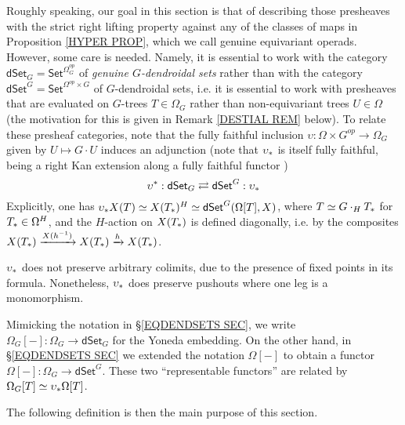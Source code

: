 \documentclass[a4paper,10pt
 ,draft
]{article}%
\begin{document}
Roughly speaking, our goal in this section is that of describing those presheaves with the 
strict right lifting property against any of the classes of maps in Proposition \ref{HYPER PROP},
which we call genuine equivariant operads.
However, some care is needed.
Namely, it is essential to work with the category
$\mathsf{dSet}_G = \mathsf{Set}^{\Omega_G^{op}}$
of \textit{genuine $G$-dendroidal sets}
rather than with the category
$\mathsf{dSet}^G = \mathsf{Set}^{\Omega^{op} \times G}$
of $G$-dendroidal sets, i.e. it is essential to work with presheaves that are evaluated on 
$G$-trees $T \in \Omega_G$
rather than non-equivariant trees $U \in \Omega$
(the motivation for this is given in 
Remark \ref{DESTIAL REM} below).
To relate these presheaf categories, note that the fully faithful inclusion
$\upsilon \colon \Omega \times G^{op} \to \Omega_G$
given by $U \mapsto G \cdot U$ induces an adjunction
(note that $\upsilon_{\**}$ is itself fully faithful, being a right Kan extension along a fully faithful functor \cite[Cor. 1.4.5]{Ri14})
\begin{equation}\label{DSETG_EQ}
	\upsilon^{\**}: \dSet_G \rightleftarrows \dSet^G : \upsilon_{\**}
\end{equation}
Explicitly, one has 
$\upsilon_{\**}X(T) \simeq X(T_{\**})^H \simeq
\mathsf{dSet}^G(\Omega[T],X)$,
where $T \simeq G \cdot_H T_{\**}$ for 
$T_{\**} \in \Omega^H$,
and the $H$-action on 
$X(T_{\**})$ is defined diagonally, i.e. by the composites
$X(T_{\**}) \xrightarrow{X(h^{-1})}
X(T_{\**}) \xrightarrow{h} X(T_{\**})$.


\begin{remark}\label{UPSPUSHMON REM}
$\upsilon_{\**}$ does not preserve arbitrary colimits, due to the presence of fixed points in its formula. Nonetheless, $\upsilon_{\**}$ does preserve pushouts where one leg is a monomorphism.
\end{remark}

\begin{remark}\label{TWOYON REM}
Mimicking the notation in \S \ref{EQDENDSETS SEC},
we write $\Omega_G[-] \colon \Omega_G \to \mathsf{dSet}_G$
for the Yoneda embedding.
On the other hand, in 
\S \ref{EQDENDSETS SEC} we extended the notation $\Omega[-]$
to obtain a functor $\Omega[-] \colon \Omega_G \to \mathsf{dSet}^G$.
These two ``representable functors'' are related by 
$\Omega_G[T] \simeq \upsilon_{\**} \Omega[T]$.
\end{remark}




The following definition is then the main purpose of this section.
\end{document}
